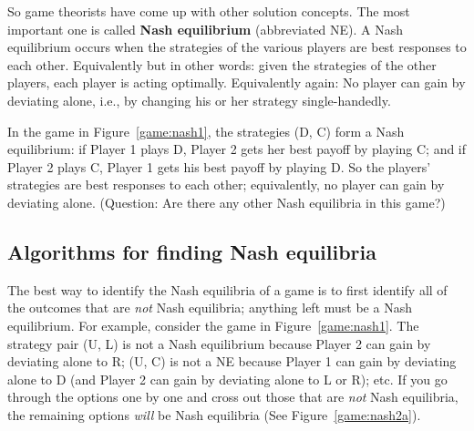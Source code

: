 

So game theorists have come up with other solution concepts. The most important one is called \textbf{Nash equilibrium} (abbreviated NE). A Nash equilibrium occurs when the strategies of the various players are best responses to each other. Equivalently but in other words: given the strategies of the other players, each player is acting optimally. Equivalently again: No player can gain by deviating alone, i.e., by changing his or her strategy single-handedly.

In the game in Figure~\ref{game:nash1}, the strategies (D, C) form a Nash equilibrium: if Player 1 plays D, Player 2 gets her best payoff by playing C; and if Player 2 plays C, Player 1 gets his best payoff by playing D. So the players' strategies are best responses to each other; equivalently, no player can gain by deviating alone. (Question: Are there any other Nash equilibria in this game?)







\subsection*{Algorithms for finding Nash equilibria}

The best way to identify the Nash equilibria of a game is to first identify all of the outcomes that are \emph{not} Nash equilibria; anything left must be a Nash equilibrium. For example, consider the game in Figure~\ref{game:nash1}. The strategy pair (U, L) is not a Nash equilibrium because Player 2 can gain by deviating alone to R; (U, C) is not a NE because Player 1 can gain by deviating alone to D (and Player 2 can gain by deviating alone to L or R); etc. If you go through the options one by one and cross out those that are \textit{not} Nash equilibria, the remaining options \textit{will} be Nash equilibria (See Figure~\ref{game:nash2a}).


